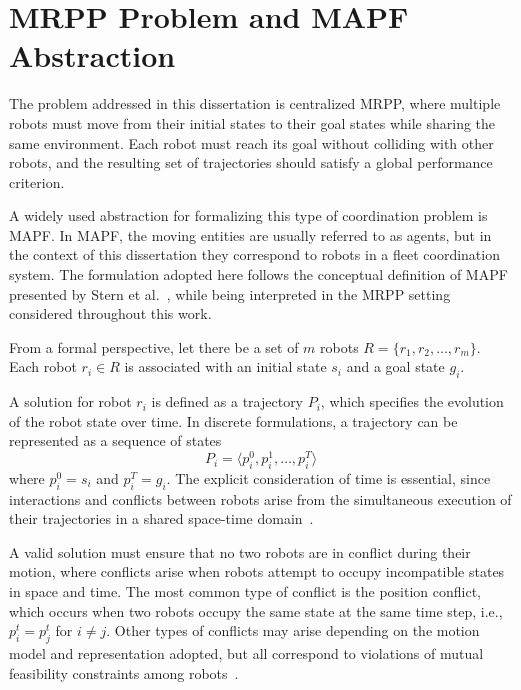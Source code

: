 \section{MRPP Problem and MAPF Abstraction}
\label{sec:problem-definition}
\hspace{\parindent}
The problem addressed in this dissertation is centralized MRPP, where
multiple robots must move from their initial states to their goal states while sharing the same
environment. Each robot must reach its goal without colliding with other robots, and the resulting
set of trajectories should satisfy a global performance criterion.

A widely used abstraction for formalizing this type of coordination problem is MAPF. In MAPF, the moving entities are usually referred to as agents, but in the context
of this dissertation they correspond to robots in a fleet coordination system. The formulation
adopted here follows the conceptual definition of MAPF presented by Stern et
al.~\cite{stern2019definitions}, while being interpreted in the MRPP setting considered throughout
this work.

From a formal perspective, let there be a set of \(m\) robots \(R = \{r_1, r_2, \dots, r_m\}\).
Each robot \(r_i \in R\) is associated with an initial state \(s_i\) and a goal state \(g_i\).

A solution for robot \(r_i\) is defined as a trajectory \(P_i\), which specifies the evolution of the
robot state over time. In discrete formulations, a trajectory can be represented as a sequence of
states
\begin{equation}
    P_i = \langle p_i^0, p_i^1, \dots, p_i^T \rangle
\end{equation}
where \(p_i^0 = s_i\) and \(p_i^T = g_i\). The explicit consideration of time is essential, since
interactions and conflicts between robots arise from the simultaneous execution of their
trajectories in a shared space-time domain~\cite{stern2019definitions}.

A valid solution must ensure that no two robots are in conflict during their motion, where conflicts
arise when robots attempt to occupy incompatible states in space and time. The most common type of
conflict is the position conflict, which occurs when two robots occupy the same state at the same
time step, i.e., \(p_i^t = p_j^t\) for \(i \neq j\). Other types of conflicts may arise depending on
the motion model and representation adopted, but all correspond to violations of mutual feasibility
constraints among robots~\cite{stern2019definitions}.

